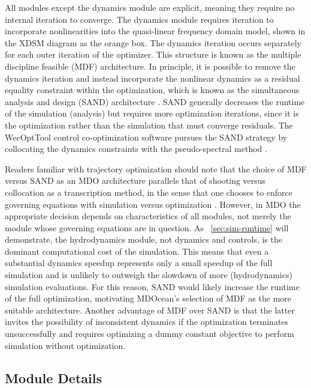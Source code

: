 All modules except the dynamics module are explicit, meaning they require no internal iteration to converge.
The dynamics module requires iteration to incorporate nonlinearities into the quasi-linear frequency domain model, shown in the XDSM diagram as the orange box.
The dynamics iteration occurs separately for each outer iteration of the optimizer.
This structure is known as the multiple discipline feasible (MDF) architecture.
In principle, it is possible to remove the dynamics iteration and instead incorporate the nonlinear dynamics as a residual equality constraint within the optimization, which is known as the simultaneous analysis and design (SAND) architecture \cite{martins_multidisciplinary_2013}.
SAND generally decreases the runtime of the simulation (analysis) but requires more optimization iterations, since it is the optimization rather than the simulation that must converge residuals. 
The WecOptTool control co-optimization software pursues the SAND strategy by collocating the dynamics constraints with the pseudo-spectral method \cite{coe_initial_2020}.

Readers familiar with trajectory optimization should note that the choice of MDF versus SAND as an MDO architecture parallels that of shooting versus collocation as a transcription method, in the sense that one chooses to enforce governing equations with simulation versus optimization \cite{underactuated}.
However, in MDO the appropriate decision depends on characteristics of all modules, not merely the module whose governing equations are in question.
As \sectionautorefname~\ref{sec:sim-runtime} will demonstrate, the hydrodynamics module, not dynamics and controls, is the dominant computational cost of the simulation.
This means that even a substantial dynamics speedup represents only a small speedup of the full simulation and is unlikely to outweigh the slowdown of more (hydrodynamics) simulation evaluations.
For this reason, SAND would likely increase the runtime of the full optimization, motivating MDOcean's selection of MDF as the more suitable architecture.
Another advantage of MDF over SAND is that the latter invites the possibility of inconsistent dynamics if the optimization terminates unsuccessfully \cite{martins_multidisciplinary_2013} and requires optimizing a dummy constant objective to perform simulation without optimization.

\subsection{Module Details}
\label{sec:modules}

